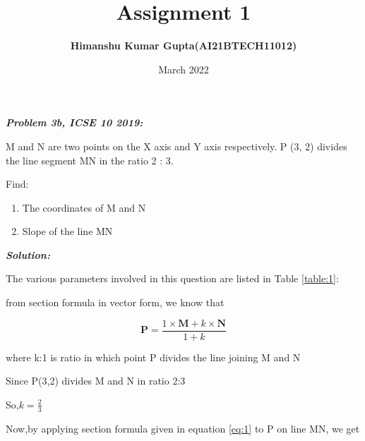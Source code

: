 \documentclass[journal,12pt,twocolumn]{IEEEtran}
\begin{document}
\newcommand{\myvec}[1]{\ensuremath{\begin{pmatrix}#1\end{pmatrix}}}

\let\vec\mathbf


\title{Assignment 1}
\author{\textbf{Himanshu Kumar Gupta(AI21BTECH11012)}}
\maketitle
\date {March 2022}


\textbf{\textit{Problem 3b, ICSE 10 2019:}}


 M and N are two points on the X axis and Y axis respectively. 
P (3, 2) divides the line segment MN in the ratio 2 : 3.

Find:
\begin{enumerate}
    \item The coordinates of M and N
    \item Slope of the line MN
\end{enumerate}

\textbf{\textit{Solution:}}

	The various parameters involved in this question are listed in Table \eqref{table:1}:
	\begin{table}[ht!]
		
		\vspace{5pt}
		\caption{}
		\label{table:1}	
	\end{table}

  from section formula in vector form, we know that
  
  \begin{equation}
  \label{eq:1}
\vec{P}=\frac{1\times \vec{M} +k\times \vec{N}}{1+k}     
  \end{equation}
 
  where k:1 is ratio in which point P divides the line joining M and N
  
Since P(3,2) divides M and N in ratio 2:3

So,$ k=\frac{2}{3}$

Now,by applying section formula given in equation \eqref{eq:1} to P on line MN, we get
\end{document}
